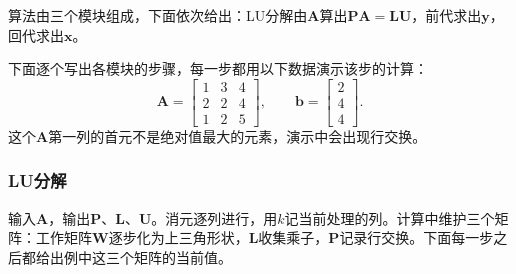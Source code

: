 算法由三个模块组成，下面依次给出：LU分解由$\bm A$算出$\bm P\bm A=\bm L\bm U$，前代求出$\bm y$，回代求出$\bm x$。

下面逐个写出各模块的步骤，每一步都用以下数据演示该步的计算：
\[
 \bm A=\begin{bmatrix}1&3&4\\2&2&4\\1&2&5\end{bmatrix},\qquad
 \bm b=\begin{bmatrix}2\\4\\4\end{bmatrix}.
\]
这个$\bm A$第一列的首元不是绝对值最大的元素，演示中会出现行交换。

\subsubsection{LU分解}
输入$\bm A$，输出$\bm P$、$\bm L$、$\bm U$。消元逐列进行，用$k$记当前处理的列。计算中维护三个矩阵：工作矩阵$\bm W$逐步化为上三角形状，$\bm L$收集乘子，$\bm P$记录行交换。下面每一步之后都给出例中这三个矩阵的当前值。
